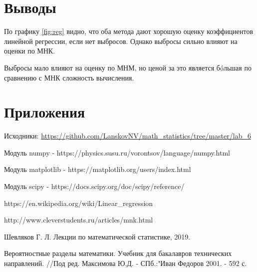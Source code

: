 \documentclass[12pt]{article}
\begin{document}
\section{Выводы}
По графику \ref{fig:reg} видно, что оба метода дают хорошую оценку коэффициентов линейной регрессии, если нет выбросов. Однако выбросы сильно влияют на оценки по МНК.

Выбросы мало влияют на оценку по МНМ, но ценой за это является б\'oльшая по сравнению с МНК сложность вычисления.

\section{Приложения}

Исходники: \url{https://github.com/LanskovNV/math_statistics/tree/master/lab_6}

\begin{thebibliography}{}
      Модуль numpy  -  https://physics.susu.ru/vorontsov/language/numpy.html
    
    Модуль matplotlib - https://matplotlib.org/users/index.html
    
    Модуль scipy - https://docs.scipy.org/doc/scipy/reference/
    
    https://en.wikipedia.org/wiki/Linear\_regression

http://www.cleverstudents.ru/articles/mnk.html

Шевляков Г. Л. Лекции по математической статистике, 2019.

Вероятностные разделы математики. Учебник для бакалавров технических направлений. //Под ред. Максимова Ю.Д. - СПб.:"Иван Федоров 2001. - 592 с.


\end{thebibliography}
\end{document}
